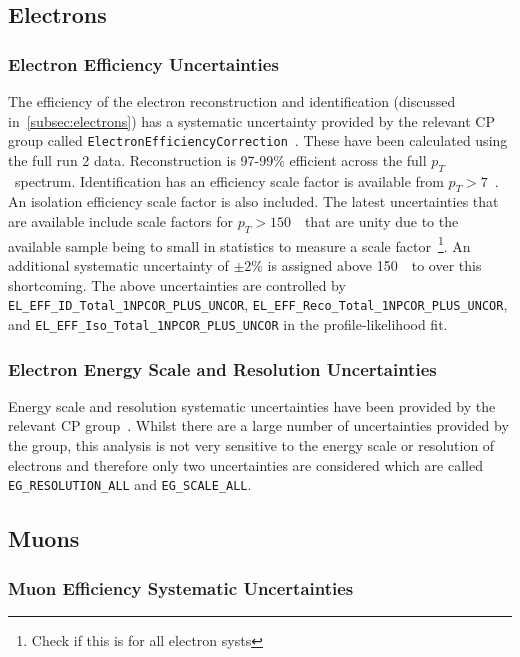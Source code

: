 \subsection{Electrons}

\subsubsection{Electron Efficiency Uncertainties}

The efficiency of the electron reconstruction and identification (discussed
in~\ref{subsec:electrons}) has a systematic uncertainty provided by the relevant
CP group called \texttt{ElectronEfficiencyCorrection}~\cite{electronTWiki}.
These have been calculated using the full run 2 data. Reconstruction is 97-99\%
efficient across the full $p_T$~spectrum. Identification has an efficiency scale
factor is available from $p_T>7$~\GeV. An isolation efficiency scale factor is
also included. The latest uncertainties that are available include scale factors
for $p_T>150$~\GeV\ that are unity due to the available sample being to small in
statistics to measure a scale factor~\footnote{Check if this is for all electron
  systs}. An additional systematic uncertainty of $\pm 2\%$ is assigned above
150~\GeV\ to over this shortcoming. The above uncertainties are controlled by
\texttt{EL\_EFF\_ID\_Total\_1NPCOR\_PLUS\_UNCOR},
\texttt{EL\_EFF\_Reco\_Total\_1NPCOR\_PLUS\_UNCOR}, and
\texttt{EL\_EFF\_Iso\_Total\_1NPCOR\_PLUS\_UNCOR} in the profile-likelihood fit.

\subsubsection{Electron Energy Scale and Resolution Uncertainties}

Energy scale and resolution systematic uncertainties have been provided by the
relevant CP group~\cite{EgammaCalibTWiki}. Whilst there are a large number of
uncertainties provided by the group, this analysis is not very sensitive to the
energy scale or resolution of electrons and therefore only two uncertainties are
considered which are called \texttt{EG\_RESOLUTION\_ALL} and
\texttt{EG\_SCALE\_ALL}.

\subsection{Muons}

\subsubsection{Muon Efficiency Systematic Uncertainties}

